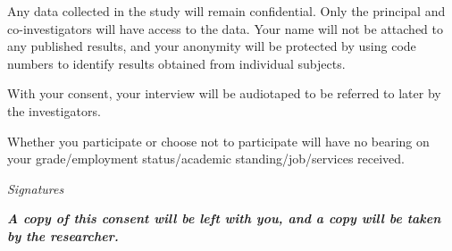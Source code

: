 \documentclass{article}
\begin{document}
\begin{appendices}
Any data collected in the study will remain confidential. Only the principal and co-investigators will have access to the data. Your name will not be attached to any published results, and your anonymity will be protected by using code numbers to identify results obtained from individual subjects.

With your consent, your interview will be audiotaped to be referred to later by the investigators.

Whether you participate or choose not to participate will have no bearing on your grade/employment status/academic standing/job/services received.

\begin{center}
    \textit{Signatures}
\end{center}

\emph{\textbf{A copy of this consent will be left with you, and a copy
will be taken by the researcher.}}


\end{appendices}



%
%
%



\end{document}
